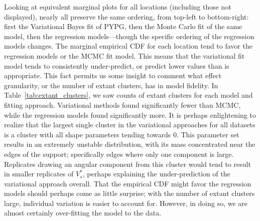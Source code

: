 Looking at equivalent marginal plots for all locations (including those not displayed), nearly 
    all preserve the same ordering, from top-left to bottom-right: first the Variational Bayes 
    fit of PYPG, then the Monte Carlo fit of the same model, then the regression models---though 
    the specific ordering of the regression models changes.  The marginal empirical CDF for each 
    location tend to favor the regression models or the MCMC fit model.
    This means that the variational fit model 
    tends to consistently under-predict, or predict lower values than is appropriate. This fact
    permits us some insight to comment what effect granularity, or the number of extant clusters, 
    has in model fidelity.  In Table~\ref{tab:extant_clusters}, we saw counts of extant clusters
    for each model and fitting approach.  Variational methods found significantly fewer than MCMC, 
    while the regression models found significantly more.  It is perhaps enlightening to realize
    that the largest single cluster in the variational approaches for all datasets is a cluster
    with all shape parameters tending towards 0.  This parameter set results in an extremely unstable
    distribution, with its mass concentrated near the edges of the support; specifically edges
    where only one component is large.  Replicates drawing an angular component from this cluster 
    would tend to result in smaller replicates of $V_s^*$, perhaps explaining the under-prediction 
    of the variational approach overall.  That the empirical CDF might favor the regression models
    should perhaps come as little surprise; with the number of extant clusters large, individual 
    variation is easier to account for.  However, in doing so, we are almost certainly over-fitting
    the model to the data.
    

